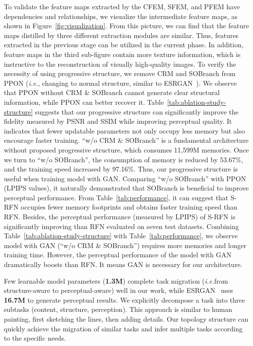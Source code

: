 \documentclass[preprint]{elsarticle}
\newcommand{\ie}{\textit{i.e.}}
\begin{document}
To validate the feature maps extracted by the CFEM, SFEM, and PFEM have dependencies and relationships, we visualize the intermediate feature maps, as shown in Figure~\ref{fig:visualization}. From this picture, we can find that the feature maps distilled by three different extraction modules are similar. Thus, features extracted in the previous stage can be utilized in the current phase. In addition, feature maps in the third sub-figure contain more texture information, which is instructive to the reconstruction of visually high-quality images. To verify the necessity of using progressive structure, we remove CRM and SOBranch from PPON (\ie, changing to normal structure, similar to ESRGAN~\cite{ESRGAN}). We observe that PPON without CRM \& SOBranch cannot generate clear structural information, while PPON can better recover it. Table~\ref{tab:ablation-study-structure} suggests that our progressive structure can significantly improve the fidelity measured by PSNR and SSIM while improving perceptual quality. It indicates that fewer updatable parameters not only occupy less memory but also encourage faster training. ``w/o CRM \& SOBranch'' is a fundamental architecture without proposed progressive structure, which consumes 11,599M memories. Once we turn to ``w/o SOBranch'', the consumption of memory is reduced by 53.67\%, and the training speed increased by 97.16\%. Thus, our progressive structure is useful when training model with GAN. Comparing ``w/o SOBranch'' with PPON (LPIPS values), it naturally demonstrated that SOBranch is beneficial to improve perceptual performance. From Table~\ref{tab:performance}, it can suggest that S-RFN occupies fewer memory footprints and obtains faster training speed than RFN. Besides, the perceptual performance (measured by LPIPS) of S-RFN is significantly improving than RFN evaluated on seven test datasets. Combining Table~\ref{tab:ablation-study-structure} with Table~\ref{tab:performance}, we observe model with GAN (``w/o CRM \& SOBranch'') requires more memories and longer training time. However, the perceptual performance of the model with GAN dramatically boosts than RFN. It means GAN is necessary for our architecture.

Few learnable model parameters (\textbf{1.3M}) complete task migration (\ie from structure-aware to perceptual-aware) well in our work, while ESRGAN~\cite{ESRGAN} uses \textbf{16.7M} to generate perceptual results. We explicitly decompose a task into three subtasks (content, structure, perception). This approach is similar to human painting, first sketching the lines, then adding details. Our topology structure can quickly achieve the migration of similar tasks and infer multiple tasks according to the specific needs.
\end{document}
